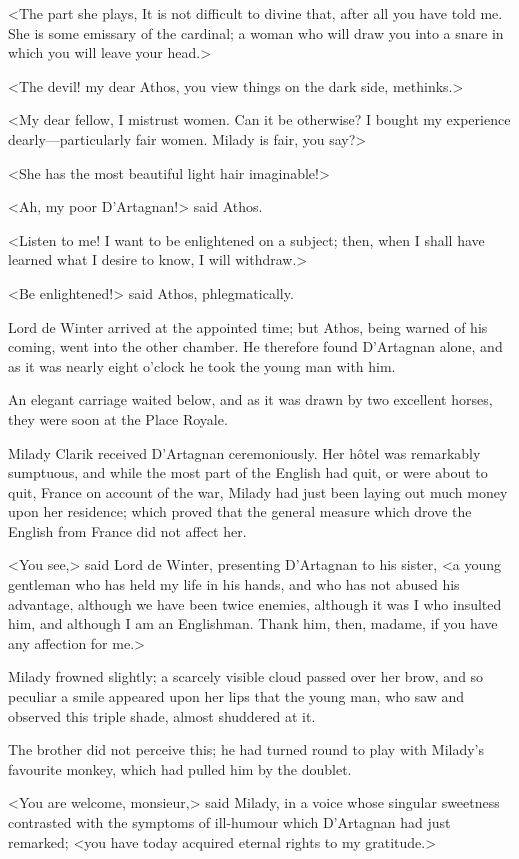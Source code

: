 <The part she plays,  It is not difficult to divine that, after all you have told me. She is some emissary of the cardinal; a woman who will draw you into a snare in which you will leave your head.> 

<The devil! my dear Athos, you view things on the dark side, methinks.> 

<My dear fellow, I mistrust women. Can it be otherwise? I bought my experience dearly—particularly fair women. Milady is fair, you say?> 

<She has the most beautiful light hair imaginable!> 

<Ah, my poor D'Artagnan!> said Athos. 

<Listen to me! I want to be enlightened on a subject; then, when I shall have learned what I desire to know, I will withdraw.> 

<Be enlightened!> said Athos, phlegmatically. 

Lord de Winter arrived at the appointed time; but Athos, being warned of his coming, went into the other chamber. He therefore found D'Artagnan alone, and as it was nearly eight o'clock he took the young man with him. 

An elegant carriage waited below, and as it was drawn by two excellent horses, they were soon at the Place Royale. 

Milady Clarik received D'Artagnan ceremoniously. Her hôtel was remarkably sumptuous, and while the most part of the English had quit, or were about to quit, France on account of the war, Milady had just been laying out much money upon her residence; which proved that the general measure which drove the English from France did not affect her. 

<You see,> said Lord de Winter, presenting D'Artagnan to his sister, <a young gentleman who has held my life in his hands, and who has not abused his advantage, although we have been twice enemies, although it was I who insulted him, and although I am an Englishman. Thank him, then, madame, if you have any affection for me.> 

Milady frowned slightly; a scarcely visible cloud passed over her brow, and so peculiar a smile appeared upon her lips that the young man, who saw and observed this triple shade, almost shuddered at it. 

The brother did not perceive this; he had turned round to play with Milady's favourite monkey, which had pulled him by the doublet. 

<You are welcome, monsieur,> said Milady, in a voice whose singular sweetness contrasted with the symptoms of ill-humour which D'Artagnan had just remarked; <you have today acquired eternal rights to my gratitude.> 

